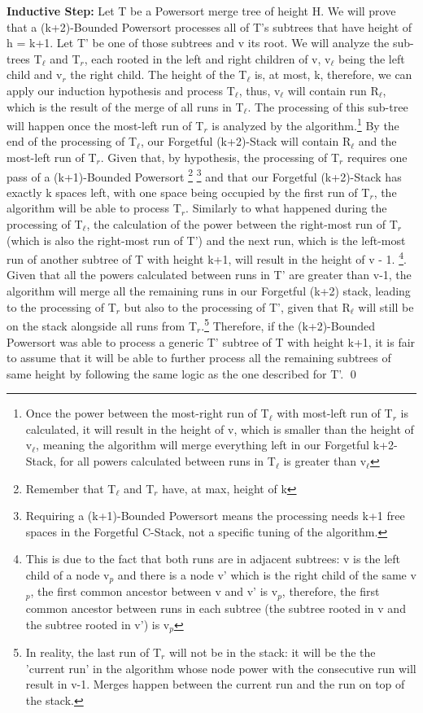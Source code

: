 \documentclass{article}
\begin{document}
\textbf{Inductive Step:} Let T be a Powersort merge tree of height H. We will prove that a (k+2)-Bounded Powersort 
processes all of T's subtrees that have height of h = k+1. Let T' be one of those subtrees and v its root. 
We will analyze the sub-trees T$_\ell$ and T$_r$, each rooted in the left and right children of v, v$_\ell$ 
being the left child and v$_r$ the right child. The height of the T$_\ell$ is, at most, k, therefore, 
we can apply our induction hypothesis and process T$_\ell$, thus, v$_\ell$ will contain run R$_\ell$, 
which is the result of the merge of all runs in T$_\ell$. The processing of this sub-tree will happen once the 
most-left run of T$_r$ is analyzed by the algorithm.\footnote{Once the power between the most-right run of T$_\ell$ 
with most-left run of T$_r$ is calculated, it will result in the height of v, 
which is smaller than the height of v$_\ell$, meaning the algorithm will merge everything left in our Forgetful k+2-Stack, 
for all powers calculated between runs in T$_\ell$ is greater than v$_\ell$} 
By the end of the processing of T$_\ell$, our Forgetful (k+2)-Stack will contain R$_\ell$ and
the most-left run of T$_r$. Given that, by hypothesis, the processing of T$_r$ requires one pass of
a (k+1)-Bounded Powersort
\footnote{Remember that T$_\ell$ and T$_r$ have, at max, height of k}
\footnote{Requiring a (k+1)-Bounded Powersort means the processing needs k+1 free spaces in the Forgetful C-Stack,
not a specific tuning of the algorithm.} and that our Forgetful (k+2)-Stack has
exactly k spaces left, with one space being occupied by the first run of T$_r$, 
the algorithm will be able to process T$_r$. Similarly to what happened during the processing of T$_\ell$, 
the calculation of the power between the right-most run of T$_r$ (which is also the right-most run of T') 
and the next run, which is the left-most run of another subtree of T with height k+1, will result 
in the height of v - 1.
\footnote{This is due to the fact that both runs are in adjacent subtrees: v is the left child of a node v$_p$ and 
there is a node v' which is the right child of the same v$_p$, the first common ancestor between v and 
v' is v$_p$, therefore, the first common ancestor between runs in each subtree (the subtree rooted in v and 
the subtree rooted in v') is v$_p$}. Given that all the powers calculated between runs in T' are greater than v-1, 
the algorithm will merge all the remaining runs in our Forgetful (k+2) stack, leading to the processing of T$_r$ but 
also to the processing of T', given that R$_\ell$ will still be on the stack alongside all runs from T$_r$.\footnote{
In reality, the last run of T$_r$ will not be in the stack: it will be the the 'current run' in the algorithm whose node power with the 
consecutive run will result in v-1. Merges happen between the current run and the run on top of the stack.
}
Therefore, if the (k+2)-Bounded Powersort was able to process a generic T' subtree of T with height k+1, it is fair 
to assume that it will be able to further process all the remaining subtrees of same height by following the same 
logic as the one described for T'.
\qed
\end{document}
